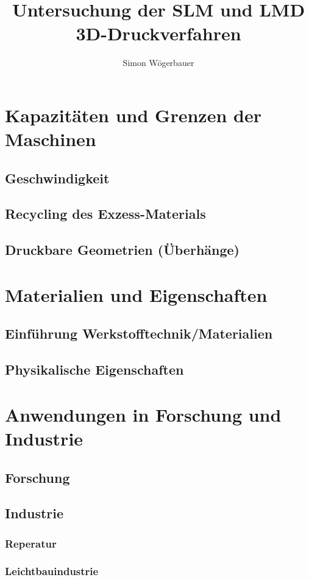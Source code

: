 \documentclass[12pt]{article}
\title{Untersuchung der SLM und LMD 3D-Druckverfahren}
\author{Simon Wögerbauer}
\begin{document}

%
\pagebreak
\pagebreak
{}
\tableofcontents
\pagebreak



\section{Kapazitäten und Grenzen der Maschinen}
\subsection{Geschwindigkeit}
\subsection{Recycling des Exzess-Materials}
\subsection{Druckbare Geometrien (Überhänge)}
\section{Materialien und Eigenschaften}
\subsection{Einführung Werkstofftechnik/Materialien}
\subsection{Physikalische Eigenschaften}

\section{Anwendungen in Forschung und Industrie}
\subsection{Forschung}
\subsection{Industrie}
\subsubsection{Reperatur}
\subsubsection{Leichtbauindustrie}
\pagebreak
\pagebreak
\printnoidxglossary[sort=use, type=\acronymtype]
\printnoidxglossary[sort=use]
\pagebreak
\printbibliography[filter=def]
\pagebreak
\printbibliography[title={Web-Quellen}, filter=web]
\pagebreak
\listoffigures
\end{document}
